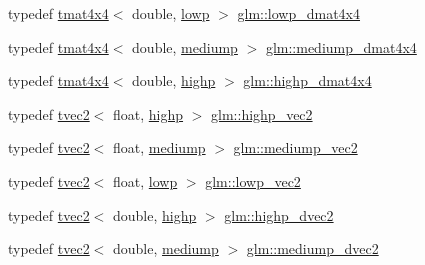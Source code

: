 \begin{DoxyCompactItemize}
\item 
typedef \mbox{\hyperlink{structglm_1_1tmat4x4}{tmat4x4}}$<$ double, \mbox{\hyperlink{namespaceglm_a0f04f086094c747d227af4425893f545ae161af3fc695e696ce3bf69f7332bc2d}{lowp}} $>$ \mbox{\hyperlink{group__core__precision_gad9168c20a21d1bfeb0f5d2ddfb98f519}{glm\+::lowp\+\_\+dmat4x4}}
\item 
typedef \mbox{\hyperlink{structglm_1_1tmat4x4}{tmat4x4}}$<$ double, \mbox{\hyperlink{namespaceglm_a0f04f086094c747d227af4425893f545a6416f3ea0c9025fb21ed50c4d6620482}{mediump}} $>$ \mbox{\hyperlink{group__core__precision_ga6dc4057e30931ebd0b5d7e44ef27763a}{glm\+::mediump\+\_\+dmat4x4}}
\item 
typedef \mbox{\hyperlink{structglm_1_1tmat4x4}{tmat4x4}}$<$ double, \mbox{\hyperlink{namespaceglm_a0f04f086094c747d227af4425893f545ac6f7eab42eacbb10d59a58e95e362074}{highp}} $>$ \mbox{\hyperlink{group__core__precision_ga46855bd8fdcb8dbc7db5d2aaeb91be69}{glm\+::highp\+\_\+dmat4x4}}
\item 
typedef \mbox{\hyperlink{structglm_1_1tvec2}{tvec2}}$<$ float, \mbox{\hyperlink{namespaceglm_a0f04f086094c747d227af4425893f545ac6f7eab42eacbb10d59a58e95e362074}{highp}} $>$ \mbox{\hyperlink{group__core__precision_ga84532f0e0c7e2af99edd65dc182aba51}{glm\+::highp\+\_\+vec2}}
\item 
typedef \mbox{\hyperlink{structglm_1_1tvec2}{tvec2}}$<$ float, \mbox{\hyperlink{namespaceglm_a0f04f086094c747d227af4425893f545a6416f3ea0c9025fb21ed50c4d6620482}{mediump}} $>$ \mbox{\hyperlink{group__core__precision_ga949639029259b8bf5c4bc96bd2cc5a59}{glm\+::mediump\+\_\+vec2}}
\item 
typedef \mbox{\hyperlink{structglm_1_1tvec2}{tvec2}}$<$ float, \mbox{\hyperlink{namespaceglm_a0f04f086094c747d227af4425893f545ae161af3fc695e696ce3bf69f7332bc2d}{lowp}} $>$ \mbox{\hyperlink{group__core__precision_ga1b46182364e2054858f9e7a70f8c52bc}{glm\+::lowp\+\_\+vec2}}
\item 
typedef \mbox{\hyperlink{structglm_1_1tvec2}{tvec2}}$<$ double, \mbox{\hyperlink{namespaceglm_a0f04f086094c747d227af4425893f545ac6f7eab42eacbb10d59a58e95e362074}{highp}} $>$ \mbox{\hyperlink{group__core__precision_ga74ad90a083be6c50f6c285d6ab15a198}{glm\+::highp\+\_\+dvec2}}
\item 
typedef \mbox{\hyperlink{structglm_1_1tvec2}{tvec2}}$<$ double, \mbox{\hyperlink{namespaceglm_a0f04f086094c747d227af4425893f545a6416f3ea0c9025fb21ed50c4d6620482}{mediump}} $>$ \mbox{\hyperlink{group__core__precision_gafc1ed63d5e5d1ddcf67752143f4f5871}{glm\+::mediump\+\_\+dvec2}}

\end{DoxyCompactItemize}
